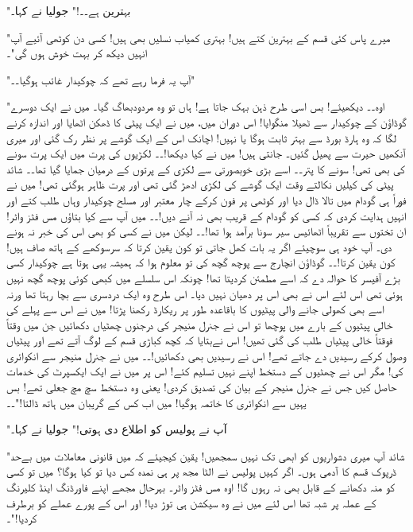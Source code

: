 "بہترین ہے۔۔!" جولیا نے کہا۔

"میرے پاس کئی قسم کے بہترین کتے ہیں! بہتری کمیاب نسلیں بھی ہیں! کسی دن کوٹھی آئیے آپ انہیں دیکھ کر بہت خوش ہوں گی"۔

"آپ یہ فرما رہے تھے کہ چوکیدار غائب ہوگیا۔۔"

"اوہ۔۔ دیکھیئے! بس اسی طرح ذہن بہک جاتا ہے! ہاں تو وہ مردودبھاگ گیا۔ میں نے ایک دوسرے گوڈاؤن کے چوکیدار سے ٹھیلا منگوایا! اس دوران میں، میں نے ایک پیٹی کا ڈھکن اٹھایا اور اندازہ کرنے لگا کہ وہ ہارڈ بورڈ سے بہتر ثابت ہوگا یا نہیں! اچانک اس کے ایک گوشے پر نظر رک گئی اور میری آنکھیں حیرت سے پھیل گئیں۔ جانتی ہیں! میں نے کیا دیکھا!۔۔ لکڑیوں کی پرت میں ایک پرت سونے کی بھی تھی! سونے کا پتر۔۔ اسے بڑی خوبصورتی سے لکڑی کے پرتوں کے درمیان جمایا گیا تھا۔۔ شائد پیٹی کی کیلیں نکالتے وقت ایک گوشے کی لکڑی ادھڑ گئی تھی اور پرت ظاہر ہوگئی تھی! میں نے فوراً ہی گودام میں تالا ڈال دیا اور کوٹھی پر فون کرکے چار معتبر اور مسلح چوکیدار وہاں طلب کتے اور انہیں ہدایت کردی کہ کسی کو گودام کے قریب بھی نہ آنے دیں!۔۔ میں آپ سے کیا بتاؤں مس فٹز واٹر! ان تختوں سے تقریباً اٹھائیس سیر سونا برآمد ہوا تھا!۔۔ لیکن میں نے کسی کو بھی اس کی خبر نہ ہونے دی۔ آپ خود ہی سوچیئے اگر یہ بات کھل جاتی تو کون یقین کرتا کہ سرسوکھے کے ہاتھ صاف ہیں! کون یقین کرتا!۔۔ گوڈاؤن انچارج سے پوچھ گچھ کی تو معلوم ہوا کہ ہمیشہ یہی ہوتا ہے چوکیدار کسی بڑے آفیسر کا حوالہ دے کہ اسے مطمئن کردیتا تھا! چونکہ اس سلسلے میں کبھی کوئی پوچھ گچھ نہیں ہوئی تھی اس لئے اس نے بھی اس پر دھیان نہیں دیا۔ اس طرح وہ ایک دردسری سے بچا رہتا تھا ورنہ اسے بھی کھولی جانے والی پیٹیوں کا باقاعدہ طور پر ریکارڈ رکھنا پڑتا! میں نے اس سے پہلے کی خالی پیٹیوں کے بارے میں پوچھا تو اس نے جنرل منیجر کی درجنوں چھٹیاں دکھائیں جن میں وقتاً فوقتاً خالی پیٹیاں طلب کی گئی تھیں! اس نےبتایا کہ کچھ کباڑی قسم کے لوگ آتے تھے اور پیٹیاں وصول کرکے رسیدیں دے جاتے تھے! اس نے رسیدیں بھی دکھائیں!۔۔ میں نے جنرل منیجر سے انکوائری کی! مگر اس نے چھٹیوں کے دستخط اپنے نہیں تسلیم کئے! اس پر میں نے ایک ایکسپرٹ کی خدمات حاصل کیں جس نے جنرل منیجر کے بیان کی تصدیق کردی! یعنی وہ دستخط سچ مچ جعلی تھے! بس یہیں سے انکوائری کا خاتمہ ہوگیا! میں اب کس کے گریبان میں ہاتھ ڈالتا!"۔۔

"آپ نے پولیس کو اطلاع دی ہوتی!" جولیا نے کہا۔

"شائد آپ میری دشواریوں کو ابھی تک نہیں سمجھیں! یقین کیجیئے کہ میں قانونی معاملات میں بےحد ڈرپوک قسم کا آدمی ہوں۔ اگر کہیں پولیس نے الٹا مجھ پر ہی نمدہ کس دیا تو کیا ہوگا؟ میں تو کسی کو منہ دکھانے کے قابل بھی نہ رہوں گا! اوہ مس فٹز واٹر۔ بہرحال مجھے اپنے فاورڈنگ اینڈ کلیرنگ کے عملہ پر شبہ تھا اس لئے میں نے وہ سیکشن ہی توڑ دیا! اور اس کے پورے عملے کو برطرف کردیا!"۔

